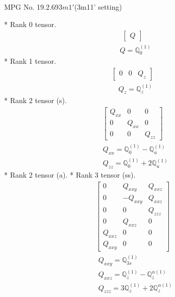 \documentclass[fleqn,8pt,landscape]{jsarticle}
\begin{document}
\setcounter{MaxMatrixCols}{32}

\renewcommand{\tablename}{Table~}
\renewcommand{\figurename}{Figure~}
\begin{center}
\LARGE
MPG No. 19.2.69\quad$3m1'$\quad(3m11' setting)
\end{center}
* Rank 0 tensor.
\begin{align*}
\begin{bmatrix} Q \end{bmatrix}
\end{align*}
\begin{align*}
& Q = \mathbb{Q}_{0}^{(1)}
\end{align*}
* Rank 1 tensor.
\begin{align*}
\begin{bmatrix} 0 & 0 & Q_{z} \end{bmatrix}
\end{align*}
\begin{align*}
& Q_{z} = \mathbb{Q}_{z}^{(1)}
\end{align*}
* Rank 2 tensor (s).
\begin{align*}
\begin{bmatrix} Q_{xx} & 0 & 0 \\ 0 & Q_{xx} & 0 \\ 0 & 0 & Q_{zz} \end{bmatrix}
\end{align*}
\begin{align*}
& Q_{xx} = \mathbb{Q}_{0}^{(1)} - \mathbb{Q}_{u}^{(1)} \\
& Q_{zz} = \mathbb{Q}_{0}^{(1)} + 2 \mathbb{Q}_{u}^{(1)}
\end{align*}
* Rank 2 tensor (a).
* Rank 3 tensor (ss).
\begin{align*}
\begin{bmatrix} 0 & Q_{xxy} & Q_{xxz} \\ 0 & - Q_{xxy} & Q_{xxz} \\ 0 & 0 & Q_{zzz} \\ 0 & Q_{xxz} & 0 \\ Q_{xxz} & 0 & 0 \\ Q_{xxy} & 0 & 0 \end{bmatrix}
\end{align*}
\begin{align*}
& Q_{xxy} = \mathbb{Q}_{3s}^{(1)} \\
& Q_{xxz} = \mathbb{Q}_{z}^{(1)} - \mathbb{Q}_{z}^{\alpha(1)} \\
& Q_{zzz} = 3 \mathbb{Q}_{z}^{(1)} + 2 \mathbb{Q}_{z}^{\alpha(1)}
\end{align*}
\end{document}
